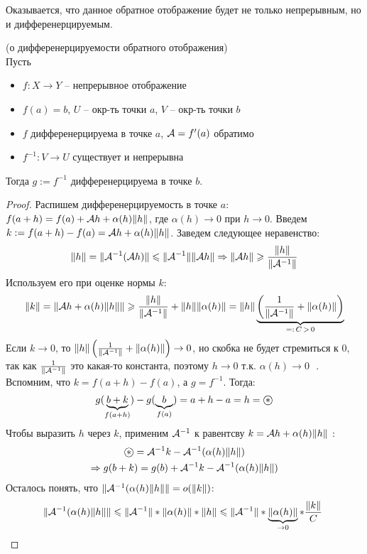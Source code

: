 Оказывается, что данное обратное отображение будет не только непрерывным, но и дифференерцируемым.
\begin{theorem} (о дифференерцируемости обратного отображения) \\
    Пусть \begin{itemize}
        \item $f: X \to Y$  -- непрерывное отображение
        \item $f(a) = b$, $U$ -- окр-ть точки $a$, $V$ -- окр-ть точки $b$
        \item $f$ дифференерцируема в точке $a$, $\mathcal{A} = f'(a)$ обратимо
        \item $f^{-1}: V \to U$ существует и непрерывна
    \end{itemize}
    Тогда $g := f^{-1}$ дифференерцируема в точке $b$.
\end{theorem}
\begin{proof}
    Распишем дифференерцируемость в точке $a$: $f(a + h) = f(a) + \mathcal{A} h + \alpha(h)\| h \|$, где $\alpha(h) \to 0$ при $h \to 0$.
    Введем $k := f(a + h) - f(a) = \mathcal{A} h + \alpha(h)\| h \|$. 
    Заведем следующее неравенство: \[ \| h \| = \| \mathcal{A}^{-1}(\mathcal{A} h) \| \leqslant \| \mathcal{A}^{-1} \| \| \mathcal{A} h \| \Rightarrow \| \mathcal{A} h \| \geqslant \frac{\| h \|}{\| \mathcal{A}^{-1} \|} \]
    \quad Используем его при оценке нормы $k$: \[ \| k \| = \| \mathcal{A} h + \alpha(h)\| h \| \| \geqslant \frac{\| h \|}{\| \mathcal{A}^{-1} \|} + \| h \|\|\alpha(h) \| = \| h \| \underbrace{\left(\frac{1}{\| \mathcal{A}^{-1} \|} + \| \alpha(h) \| \right)}_{=:\, C \, > \, 0} \]
    \quad Если $k \to 0$, то $\| h \| \left(\frac{1}{\| \mathcal{A}^{-1} \|} + \| \alpha(h) \| \right) \to 0$, но скобка не будет стремиться к 0, так как $\frac{1}{\| \mathcal{A}^{-1} \|}$ это какая-то константа, поэтому $h \to 0 \text{ т.к. $\alpha(h) \to 0$ }$.
    Вспомним, что $k = f(a+h) - f(a)$, а $g = f^{-1}$. 
    \quad Тогда: \begin{gather*}
        g(\underbrace{b + k}_{f(a+h)}) - g(\underbrace{b}_{f(a)}) = a + h - a = h = \oast 
    \end{gather*}
    \quad Чтобы выразить $h$ через $k$, применим $\mathcal{A}^{-1}$ к равентсву $k = \mathcal{A} h + \alpha(h)\| h \|$ : \begin{gather*}
        \oast = \A^{-1}k - \A^{-1}(\alpha(h) \| h \|) \\
        \Rightarrow g(b + k) = g(b) + \A^{-1}k - \A^{-1}(\alpha(h) \| h \|)
    \end{gather*}
    \quad Осталось понять, что $\| \mathcal{A}^{-1}(\alpha(h) \| h \| \| = o(\|k\|)$:
    \[ \| \mathcal{A}^{-1}(\alpha(h) \| h \| \| \leqslant \| \mathcal{A}^{-1} \| * \|\alpha(h) \| * \| h \| \leqslant \| \mathcal{A}^{-1} \| * \underbrace{\|\alpha(h) \|}_{\to 0} * \frac{\|k\|}{C}\  \]
\end{proof}

